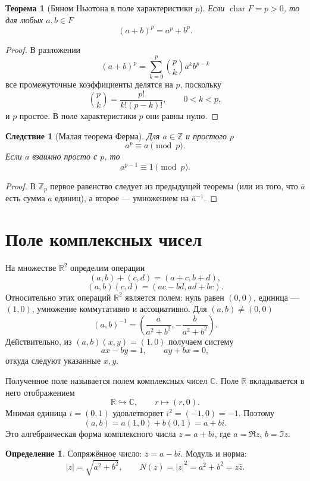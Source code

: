 \documentclass[12pt,a4paper,oneside,openany]{book}
\theoremstyle{definition}
\newtheorem{definition}{Определение}[chapter]
\theoremstyle{plain}
\newtheorem{theorem}{Теорема}[chapter]
\newtheorem{corollary}{Следствие}[chapter]
\theoremstyle{remark}
\newcommand{\Z}{\mathbb{Z}}
\newcommand{\R}{\mathbb{R}}
\newcommand{\C}{\mathbb{C}}
\begin{document}
\begin{theorem}[Бином Ньютона в поле характеристики $p$]
Если $\operatorname{char}F=p>0$, то для любых $a,b\in F$
\[
  (a+b)^p=a^p+b^p.
\]
\end{theorem}

\begin{proof}
В разложении
\[
  (a+b)^p=\sum_{k=0}^{p}\binom pk a^k b^{p-k}
\]
все промежуточные коэффициенты делятся на $p$, поскольку
\[
  \binom pk=\frac{p!}{k!(p-k)!},\qquad 0<k<p,
\]
и $p$ простое. В поле характеристики $p$ они равны нулю.
\end{proof}

\begin{corollary}[Малая теорема Ферма]
Для $a\in\Z$ и простого $p$
\[
  a^p\equiv a\pmod p.
\]
Если $a$ взаимно просто с $p$, то
\[
  a^{p-1}\equiv1\pmod p.
\]
\end{corollary}

\begin{proof}
В $\Z_p$ первое равенство следует из предыдущей теоремы (или из того,
что $\bar a$ есть сумма $a$ единиц), а второе --- умножением на
$\bar a^{-1}$.
\end{proof}


\section{Поле комплексных чисел}

На множестве $\R^2$ определим операции
\[
  (a,b)+(c,d)=(a+c,b+d),
\]
\[
  (a,b)(c,d)=(ac-bd,ad+bc).
\]
Относительно этих операций $\R^2$ является полем: нуль равен $(0,0)$,
единица --- $(1,0)$, умножение коммутативно и ассоциативно. Для
$(a,b)\ne(0,0)$
\[
  (a,b)^{-1}=\left(\frac{a}{a^2+b^2},-
  \frac{b}{a^2+b^2}\right).
\]
Действительно, из $(a,b)(x,y)=(1,0)$ получаем систему
\[
  ax-by=1,\qquad ay+bx=0,
\]
откуда следуют указанные $x,y$.

Полученное поле называется полем комплексных чисел $\C$. Поле $\R$
вкладывается в него отображением
\[
  \R\hookrightarrow\C,
  \qquad r\mapsto(r,0).
\]
Мнимая единица $i=(0,1)$ удовлетворяет $i^2=(-1,0)=-1$. Поэтому
\[
  (a,b)=a(1,0)+b(0,1)=a+bi.
\]
Это алгебраическая форма комплексного числа $z=a+bi$, где
$a=\Re z$, $b=\Im z$.

\begin{definition}
Сопряжённое число: $\bar z=a-bi$. Модуль и норма:
\[
  |z|=\sqrt{a^2+b^2},
  \qquad N(z)=|z|^2=a^2+b^2=z\bar z.
\]
\end{definition}
\end{document}
